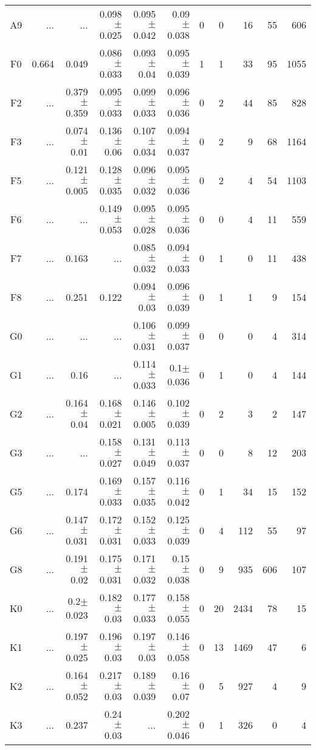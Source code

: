 \begin{table}[t]
\begin{table}[t]
\begin{center}
\begin{tabular}{c|rrrrr|rrrrr}
    A9	&	 ...	&	 ...	&	0.098$\pm$0.025	&	0.095$\pm$0.042	&	0.09$\pm$0.038	&	0	&	0	&	16	&	55	&	606	\\
    F0	&	0.664	&	0.049	&	0.086$\pm$0.033	&	0.093$\pm$0.04	&	0.095$\pm$0.039	&	1	&	1	&	33	&	95	&	1055	\\
    F2	&	 ...	&	0.379$\pm$0.359	&	0.095$\pm$0.033	&	0.099$\pm$0.033	&	0.096$\pm$0.036	&	0	&	2	&	44	&	85	&	828	\\
    F3	&	 ...	&	0.074$\pm$0.01	&	0.136$\pm$0.06	&	0.107$\pm$0.034	&	0.094$\pm$0.037	&	0	&	2	&	9	&	68	&	1164	\\
    F5	&	 ...	&	0.121$\pm$0.005	&	0.128$\pm$0.035	&	0.096$\pm$0.032	&	0.095$\pm$0.036	&	0	&	2	&	4	&	54	&	1103	\\
    F6	&	 ...	&	 ...	&	0.149$\pm$0.053	&	0.095$\pm$0.028	&	0.095$\pm$0.036	&	0	&	0	&	4	&	11	&	559	\\
    F7	&	 ...	&	0.163	&	 ...	&	0.085$\pm$0.032	&	0.094$\pm$0.033	&	0	&	1	&	0	&	11	&	438	\\
    F8	&	 ...	&	0.251	&	0.122	&	0.094$\pm$0.03	&	0.096$\pm$0.039	&	0	&	1	&	1	&	9	&	154	\\
    G0	&	 ...	&	 ...	&	 ...	&	0.106$\pm$0.031	&	0.099$\pm$0.037	&	0	&	0	&	0	&	4	&	314	\\
    G1	&	 ...	&	0.16	&	 ...	&	0.114$\pm$0.033	&	0.1$\pm$0.036	&	0	&	1	&	0	&	4	&	144	\\
    G2	&	 ...	&	0.164$\pm$0.04	&	0.168$\pm$0.021	&	0.146$\pm$0.005	&	0.102$\pm$0.039	&	0	&	2	&	3	&	2	&	147	\\
    G3	&	 ...	&	 ...	&	0.158$\pm$0.027	&	0.131$\pm$0.049	&	0.113$\pm$0.037	&	0	&	0	&	8	&	12	&	203	\\
    G5	&	 ...	&	0.174	&	0.169$\pm$0.033	&	0.157$\pm$0.035	&	0.116$\pm$0.042	&	0	&	1	&	34	&	15	&	152	\\
    G6	&	 ...	&	0.147$\pm$0.031	&	0.172$\pm$0.031	&	0.152$\pm$0.033	&	0.125$\pm$0.039	&	0	&	4	&	112	&	55	&	97	\\
    G8	&	 ...	&	0.191$\pm$0.02	&	0.175$\pm$0.031	&	0.171$\pm$0.032	&	0.15$\pm$0.038	&	0	&	9	&	935	&	606	&	107	\\
    K0	&	 ...	&	0.2$\pm$0.023	&	0.182$\pm$0.03	&	0.177$\pm$0.033	&	0.158$\pm$0.055	&	0	&	20	&	2434	&	78	&	15	\\
    K1	&	 ...	&	0.197$\pm$0.025	&	0.196$\pm$0.03	&	0.197$\pm$0.03	&	0.146$\pm$0.058	&	0	&	13	&	1469	&	47	&	6	\\
    K2	&	 ...	&	0.164$\pm$0.052	&	0.217$\pm$0.03	&	0.189$\pm$0.039	&	0.16$\pm$0.07	&	0	&	5	&	927	&	4	&	9	\\
    K3	&	 ...	&	0.237	&	0.24$\pm$0.03	&	 ...	&	0.202$\pm$0.046	&	0	&	1	&	326	&	0	&	4	\\

\end{tabular}
\end{center}
\end{table}
\end{table}
